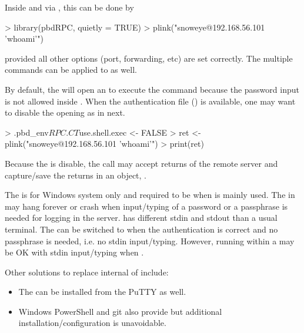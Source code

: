 Inside  and via , this can be done by
\begin{Code}[title=Basic \code{plink()} in \pkg{pbdRPC} and \proglang{R}]
> library(pbdRPC, quietly = TRUE)
> plink("snoweye@192.168.56.101 'whoami'")
\end{Code}
provided all other options (port, forwarding, etc) are set correctly.
The multiple commands can be applied to  as well.

By default,
the  will open an  to execute the
command  because the password input is not allowed inside
.
When the authentication file () is available,
one may want to disable the opening  as in next.
\begin{Code}[title=Advance \code{plink()} in \pkg{pbdRPC} and \proglang{R}]
> .pbd_env$RPC.CT$use.shell.exec <- FALSE
> ret <- plink("snoweye@192.168.56.101 'whoami'")
> print(ret)
\end{Code}
Because the  is disable, the  call
may accept returns of the remote server and capture/save the returns
in an  object, .

The  is for Windows system only and
required to be  when  is mainly used. The
 in  may hang forever or crash when input/typing of a
password or a passphrase is needed for logging in the server.
 has different stdin and stdout than a usual terminal.
The  can be switched to  when
the authentication is correct and no passphrase is needed, i.e.
{\color{red} no stdin input/typing. }
However,  running within a  may be OK with stdin
input/typing when .

Other solutions to replace internal  of 
include:
\begin{itemize}
\item
The  can be installed from the PuTTY as well.
\item
Windows PowerShell and git also provide  but
additional installation/configuration is unavoidable.
\end{itemize}

